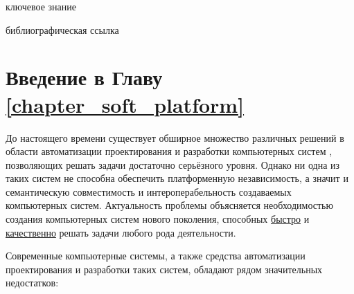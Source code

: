 \begin{SCn}
\bigskip

\begin{scnrelfromlist}{ключевое знание}
\end{scnrelfromlist}

\bigskip

\begin{scnrelfromlist}{библиографическая ссылка}
	\scnitem{***}
\end{scnrelfromlist}

\end{SCn}


\section*{Введение в Главу \ref{chapter_soft_platform}}

До настоящего времени существует обширное множество различных решений в области автоматизации проектирования и разработки компьютерных систем \cite{iliadis2019tower}, позволяющих решать задачи достаточно серьёзного уровня. Однако ни одна из таких систем не способна обеспечить платформенную независимость, а значит и семантическую совместимость и интероперабельность создаваемых компьютерных систем. Актуальность проблемы объясняется необходимостью создания компьютерных систем нового поколения, способных \underline{быстро} и \underline{качественно} решать задачи любого рода деятельности.

Современные компьютерные системы, а также средства автоматизации проектирования и разработки таких систем, обладают рядом значительных недостатков:

